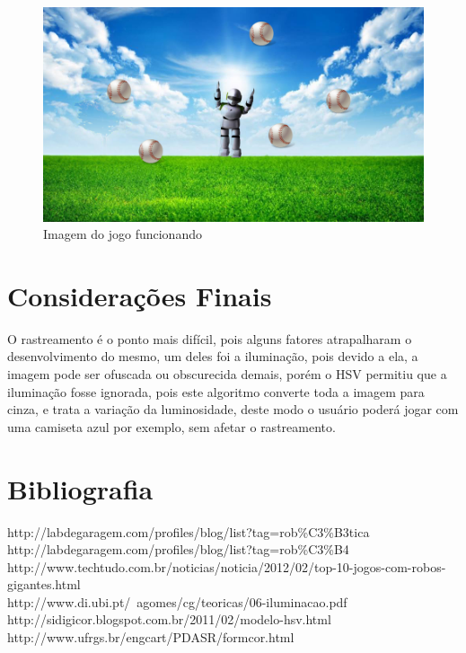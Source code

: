 \documentclass[12pt,openright,twoside,a4paper,brazil]{abntex2}
\begin{document}
\begin{figure}[!htb]
\centering
\includegraphics[scale=0.2]{fundo.jpg}
\caption{Imagem do jogo funcionando}
\end{figure}
\vspace{0.5cm}

\break

\section*{Considerações Finais}

O rastreamento é o ponto mais difícil, pois alguns fatores atrapalharam o desenvolvimento do mesmo, um deles foi a iluminação, pois devido a ela, a imagem pode ser ofuscada ou obscurecida demais, porém o HSV permitiu que a iluminação fosse ignorada, pois este algoritmo converte toda a imagem para cinza, e trata a variação da luminosidade, deste modo o usuário poderá jogar com uma camiseta azul por exemplo, sem afetar o rastreamento.

\section*{Bibliografia}

http://labdegaragem.com/profiles/blog/list?tag=rob\%C3\%B3tica \\
http://labdegaragem.com/profiles/blog/list?tag=rob\%C3\%B4 \\
http://www.techtudo.com.br/noticias/noticia/2012/02/top-10-jogos-com-robos-gigantes.html \\
http://www.di.ubi.pt/~agomes/cg/teoricas/06-iluminacao.pdf \\
http://sidigicor.blogspot.com.br/2011/02/modelo-hsv.html \\
http://www.ufrgs.br/engcart/PDASR/formcor.html
\end{document}
